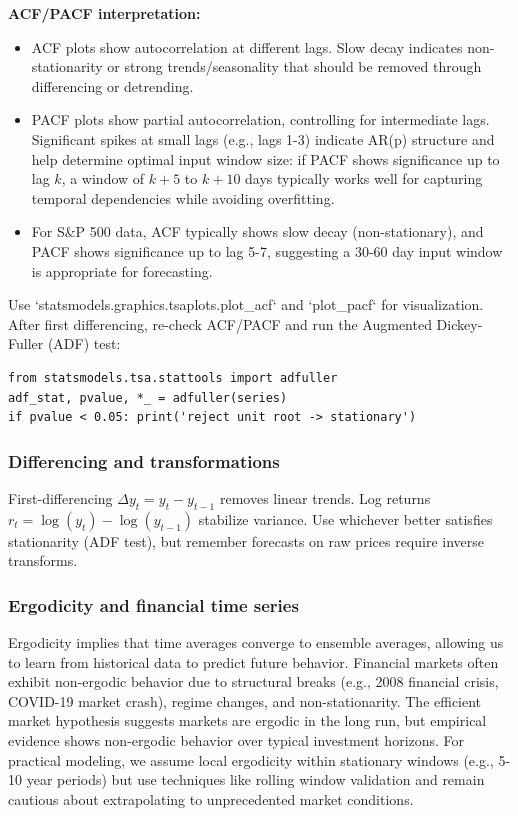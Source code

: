 \documentclass[conference]{IEEEtran}
\begin{document}
\textbf{ACF/PACF interpretation:}
\begin{itemize}
  \item ACF plots show autocorrelation at different lags. Slow decay indicates non-stationarity or strong trends/seasonality that should be removed through differencing or detrending.
  \item PACF plots show partial autocorrelation, controlling for intermediate lags. Significant spikes at small lags (e.g., lags 1-3) indicate AR(p) structure and help determine optimal input window size: if PACF shows significance up to lag $k$, a window of $k+5$ to $k+10$ days typically works well for capturing temporal dependencies while avoiding overfitting.
  \item For S\&P 500 data, ACF typically shows slow decay (non-stationary), and PACF shows significance up to lag 5-7, suggesting a 30-60 day input window is appropriate for forecasting.
\end{itemize}
Use `statsmodels.graphics.tsaplots.plot_acf` and `plot_pacf` for visualization. After first differencing, re-check ACF/PACF and run the Augmented Dickey-Fuller (ADF) test:
\begin{verbatim}
from statsmodels.tsa.stattools import adfuller
adf_stat, pvalue, *_ = adfuller(series)
if pvalue < 0.05: print('reject unit root -> stationary')
\end{verbatim}

\subsubsection{Differencing and transformations}
First-differencing $\Delta y_t = y_t - y_{t-1}$ removes linear trends. Log returns $r_t = \log(y_t) - \log(y_{t-1})$ stabilize variance. Use whichever better satisfies stationarity (ADF test), but remember forecasts on raw prices require inverse transforms.

\subsubsection{Ergodicity and financial time series}
Ergodicity implies that time averages converge to ensemble averages, allowing us to learn from historical data to predict future behavior. Financial markets often exhibit non-ergodic behavior due to structural breaks (e.g., 2008 financial crisis, COVID-19 market crash), regime changes, and non-stationarity. The efficient market hypothesis suggests markets are ergodic in the long run, but empirical evidence shows non-ergodic behavior over typical investment horizons. For practical modeling, we assume local ergodicity within stationary windows (e.g., 5-10 year periods) but use techniques like rolling window validation and remain cautious about extrapolating to unprecedented market conditions.
\end{document}
